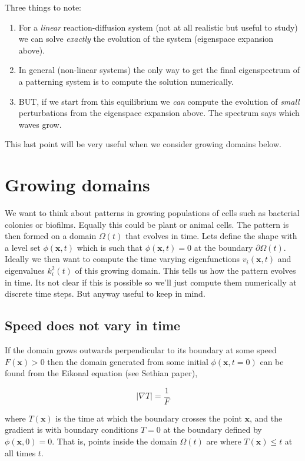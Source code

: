 \documentclass{report}
\renewcommand{\vec}[1]{\mathbf{#1}}
\begin{document}
Three things to note:
\begin{enumerate}
\item For a \textit{linear} reaction-diffusion system (not at all realistic
but useful to study) we can solve \textit{exactly} the evolution of the system
(eigenspace expansion above).
\item In general (non-linear systems) the only way to get the final eigenspectrum 
of a patterning system is to compute the solution numerically.
\item BUT, if we start from this equilibrium we \textit{can} compute the
evolution of \textit{small} perturbations from the eigenspace expansion above.
The spectrum says which waves grow.
\end{enumerate}

This last point will be very useful when we consider growing domains below.

\section{Growing domains}
We want to think about patterns in growing populations of cells such as
bacterial colonies or biofilms. Equally this could be plant or animal cells. The
pattern is then formed on a domain $\Omega(t)$ that evolves in time. Lets define
the shape with a level set $\phi(\vec{x},t)$ which is such that
$\phi(\vec{x},t)=0$ at the boundary $\partial \Omega(t)$.  Ideally we then want
to compute the time varying eigenfunctions $v_i(\vec{x},t)$ and eigenvalues
$k_i^2(t)$ of this growing domain.  This tells us how the pattern evolves in
time. Its not clear if this is possible so we'll just compute them numerically
at discrete time steps. But anyway useful to keep in mind.

\subsection{Speed does not vary in time}
If the domain grows outwards perpendicular to its boundary at some speed
$F(\vec{x})>0$ then the domain generated from some initial $\phi(\vec{x},t=0)$
can be found from the Eikonal equation (see Sethian paper),

\begin{equation}
\left| \nabla T \right| = \frac{1}{F}
\end{equation}

where $T(\vec{x})$ is the time at which the boundary crosses the point
$\vec{x}$, and the gradient is with boundary conditions $T=0$ at the 
 boundary defined by $\phi(\vec{x},0)=0$.
That is, points inside the domain $\Omega(t)$ are where
$T(\vec{x})\le t$ at all times $t$.
\end{document}
